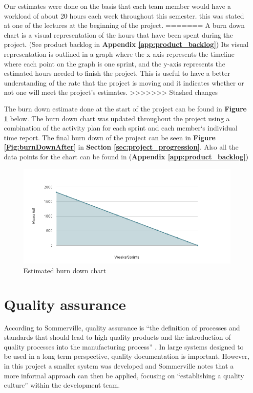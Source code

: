 Our estimates were done on the basis that each team member would have a workload of about 20 hours each week throughout this semester. this was stated at one of the lectures at the beginning of the project.   
=======
A burn down chart is a visual representation of the hours that have been spent during the project. (See product backlog in \textbf{Appendix \ref{app:product_backlog}}) Its visual representation is outlined in a graph where the x-axis represents the timeline where each point on the graph is one sprint, and the y-axis represents the estimated hours needed to finish the project. This is useful to have a better understanding of the rate that the project is moving and it indicates whether or not one will meet the project's estimates.\newline
>>>>>>> Stashed changes

The burn down estimate done at the start of the project can be found in \textbf{Figure \ref{Fig:burndownstart}} below. The burn down chart was updated throughout the project using a combination of the activity plan for each sprint and each member`s individual time report. The final burn down of the project can be seen in \textbf {Figure \ref{Fig:burnDownAfter}} in \textbf{Section \ref{sec:project_progression}}. Also all the data points for the chart can be found in (\textbf{Appendix \ref{app:product_backlog}})


\begin{figure}[h!]
	\centering
	\includegraphics[width=\textwidth]{fig/burndownstart}
	\caption{Estimated burn down chart}
	\label{Fig:burndownstart}
\end{figure}


\section{Quality assurance}

According to Sommerville, quality assurance is “the definition of processes and standards that should lead to high-quality products and the introduction of quality processes into the manufacturing process” \cite[p.652]{Sommerville}. In large systems designed to be used in a long term perspective, quality documentation is important. However, in this project a smaller system was developed and Sommerville notes that a more informal approach can then be applied, focusing on “establishing a quality culture” \cite[p.654]{Sommerville} within the development team.\newline


